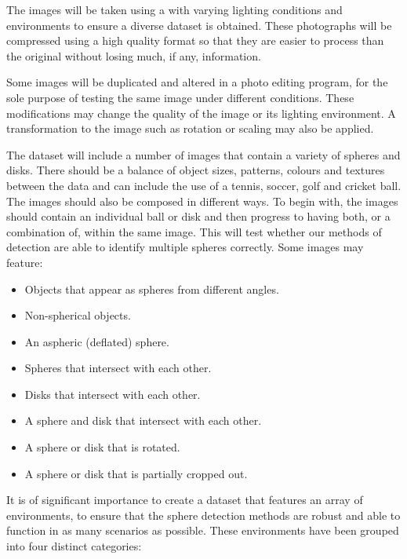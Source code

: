 \documentclass[11pt]{scrartcl}
\begin{document}
{{        	The images will be taken using a  with varying
        	lighting conditions and environments to ensure a diverse dataset is
        	obtained. These photographs will be compressed using a high quality
        	format so that they are easier to process than the original without
        	losing much, if any, information.

        	Some images will be duplicated and altered in a photo editing program,
        	for the sole purpose of testing the same image under different 
        	conditions. These modifications may change the quality of the image or
        	its lighting environment. A transformation to the image such as rotation
        	or scaling may also be applied.

        	The dataset will include a number of images that contain a variety of
        	spheres and disks. There should be a balance of object sizes, patterns,
        	colours and textures between the data and can include the use of a
        	tennis, soccer, golf and cricket ball. The images should also be
        	composed in different ways. To begin with, the images should contain an
        	individual ball or disk and then progress to having both, or a 
        	combination of, within the same image. This will test whether our
        	methods of detection are able to identify multiple spheres correctly.
			Some images may feature:

        	\begin{itemize}
        		\item Objects that appear as spheres from different angles.
        		\item Non-spherical objects.
        		\item An aspheric (deflated) sphere.
        		\item Spheres that intersect with each other.
        		\item Disks that intersect with each other.
        		\item A sphere and disk that intersect with each other.
        		\item A sphere or disk that is rotated.
        		\item A sphere or disk that is partially cropped out.
        	\end{itemize}

        	It is of significant importance to create a dataset that features an
        	array of environments, to ensure that the sphere detection methods are
        	robust and able to function in as many scenarios as possible. These
        	environments have been grouped into four distinct categories:

}}
\end{document}
